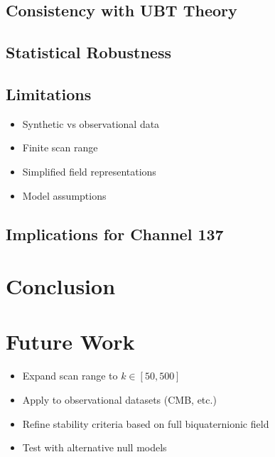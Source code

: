 \documentclass[11pt,a4paper]{article}
\begin{document}

\subsection{Consistency with UBT Theory}


\subsection{Statistical Robustness}


\subsection{Limitations}

\begin{itemize}
    \item Synthetic vs observational data
    \item Finite scan range
    \item Simplified field representations
    \item Model assumptions
\end{itemize}

\subsection{Implications for Channel 137}


\section{Conclusion}


\section{Future Work}

\begin{itemize}
    \item Expand scan range to $k \in [50, 500]$
    \item Apply to observational datasets (CMB, etc.)
    \item Refine stability criteria based on full biquaternionic field
    \item Test with alternative null models
\end{itemize}
\end{document}
